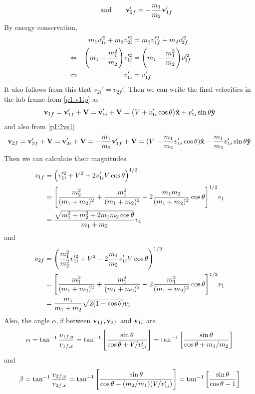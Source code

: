 \documentclass[12pt]{article}
\begin{document}
\begin{problem}{1}
\begin{solution}
\begin{equation}
    \qquad\text{and}\qquad
    \vb{v}_{2f}'=-\frac{m_1}{m_2}\vb{v}_{1f}'
\end{equation}
By energy conservation,
\begin{alignat}{2}
    &&m_1v_{1i}'^2+m_2v_{2i}'^2
    &=m_1v_{1f}'^2+m_2v_{2f}'^2\notag\\
    &\Leftrightarrow&\qty(m_1-\frac{m_1^2}{m_2})v_{1i}'^2
    &=\qty(m_1-\frac{m_1^2}{m_2})v_{1f}'^2\notag\\
    &\Leftrightarrow&v_{1i}'&=v_{1f}'
\end{alignat}
It also follows from this that $v_{2i}'=v_{2f}'$. Then we can write the final
velocities in the lab frame from \eqref{p1:v1ip} as
\begin{equation}
    \vb{v}_{1f}=\vb{v}_{1f}'+\vb{V}=\vb{v}_{1i}'+\vb{V}
    =\qty(V+v_{1i}'\cos\theta)\vb{\hat{x}}+v_{1i}'\sin\theta\vb{\hat{y}}
\end{equation}
and also from \eqref{p1:2vs1}
\begin{equation}
    \vb{v}_{2f}=\vb{v}_{2f}'+\vb{V}=\vb{v}_{2i}'+\vb{V}
    =-\frac{m_1}{m_2}\vb{v}_{1f}'+\vb{V}
    =(V-\frac{m_1}{m_2}v_{1i}'\cos\theta)\vb{\hat{x}}
    -\frac{m_1}{m_2}v_{1i}'\sin\theta\vb{\hat{y}}
\end{equation}
Then we can calculate their magnitudes
\begin{align}
    v_{1f}&=\qty(v_{1i}'^2+V^2+2v_{1i}'V\cos\theta)^{1/2} \notag\\
          &=\qty[\frac{m_2^2}{(m_1+m_2)^2}+\frac{m_1^2}{(m_1+m_2)^2}+2\frac{m_1m_2}{(m_1+m_2)^2}\cos\theta]^{1/2}v_1\notag\\
          &=\frac{\sqrt{m_1^2+m_2^2+2m_1m_2\cos\theta}}{m_1+m_2}v_1
\end{align}
and
\begin{align}
    v_{2f}&=
    \qty(
    \frac{m_1^2}{m_2^2}v_{1i}'^2+V^2-2\frac{m_1}{m_2}v_{1i}'V\cos\theta
    )^{1/2}\notag\\
    &=\qty[\frac{m_1^2}{(m_1+m_2)^2}+\frac{m_1^2}{(m_1+m_2)^2}-2\frac{m_1^2}{(m_1+m_2)^2}\cos\theta]^{1/2}v_1\notag\\
    &=\frac{m_1}{m_1+m_2}\sqrt{2(1-\cos\theta)}v_1
\end{align}
Also, the angle $\alpha,\beta$ between $\vb{v}_{1f},\vb{v}_{2f}$ and
$\vb{v}_{1i}$ are
\begin{equation}
    \alpha=\tan^{-1}\frac{v_{1f,y}}{v_{1f,x}} 
    =\tan^{-1}\qty[\frac{\sin\theta}{\cos\theta+V/v_{1i}'}]
    =\tan^{-1}\qty[\frac{\sin\theta}{\cos\theta+m_1/m_2}]
\end{equation}
and
\begin{equation}
    \beta=\tan^{-1}\frac{v_{2f,y}}{v_{2f,x}} 
    =\tan^{-1}\qty[\frac{\sin\theta}{\cos\theta-(m_2/m_1)(V/v_{1i}')}]
    =\tan^{-1}\qty[\frac{\sin\theta}{\cos\theta-1}]
\end{equation}
\end{solution}
\end{problem}
\end{document}
